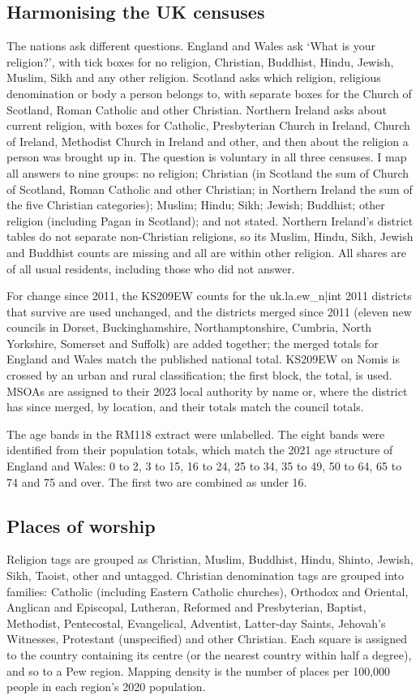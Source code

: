 \documentclass[11pt,a4paper]{article}
\begin{document}
\subsection{Harmonising the UK censuses}
The nations ask different questions. England and Wales ask `What is your religion?', with tick boxes for no religion, Christian, Buddhist, Hindu, Jewish, Muslim, Sikh and any other religion. Scotland asks which religion, religious denomination or body a person belongs to, with separate boxes for the Church of Scotland, Roman Catholic and other Christian. Northern Ireland asks about current religion, with boxes for Catholic, Presbyterian Church in Ireland, Church of Ireland, Methodist Church in Ireland and other, and then about the religion a person was brought up in. The question is voluntary in all three censuses. I map all answers to nine groups: no religion; Christian (in Scotland the sum of Church of Scotland, Roman Catholic and other Christian; in Northern Ireland the sum of the five Christian categories); Muslim; Hindu; Sikh; Jewish; Buddhist; other religion (including Pagan in Scotland); and not stated. Northern Ireland's district tables do not separate non-Christian religions, so its Muslim, Hindu, Sikh, Jewish and Buddhist counts are missing and all are within other religion. All shares are of all usual residents, including those who did not answer.

For change since 2011, the KS209EW counts for the {{uk.la.ew_n|int}} 2011 districts that survive are used unchanged, and the districts merged since 2011 (eleven new councils in Dorset, Buckinghamshire, Northamptonshire, Cumbria, North Yorkshire, Somerset and Suffolk) are added together; the merged totals for England and Wales match the published national total. KS209EW on Nomis is crossed by an urban and rural classification; the first block, the total, is used. MSOAs are assigned to their 2023 local authority by name or, where the district has since merged, by location, and their totals match the council totals.

The age bands in the RM118 extract were unlabelled. The eight bands were identified from their population totals, which match the 2021 age structure of England and Wales: 0 to 2, 3 to 15, 16 to 24, 25 to 34, 35 to 49, 50 to 64, 65 to 74 and 75 and over. The first two are combined as under 16.

\subsection{Places of worship}
Religion tags are grouped as Christian, Muslim, Buddhist, Hindu, Shinto, Jewish, Sikh, Taoist, other and untagged. Christian denomination tags are grouped into families: Catholic (including Eastern Catholic churches), Orthodox and Oriental, Anglican and Episcopal, Lutheran, Reformed and Presbyterian, Baptist, Methodist, Pentecostal, Evangelical, Adventist, Latter-day Saints, Jehovah's Witnesses, Protestant (unspecified) and other Christian. Each square is assigned to the country containing its centre (or the nearest country within half a degree), and so to a Pew region. Mapping density is the number of places per 100,000 people in each region's 2020 population.
\end{document}
